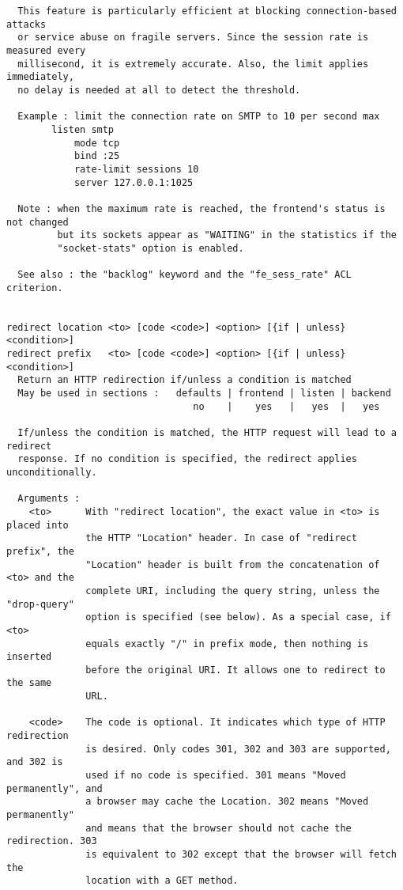 \begin{verbatim}
  This feature is particularly efficient at blocking connection-based attacks
  or service abuse on fragile servers. Since the session rate is measured every
  millisecond, it is extremely accurate. Also, the limit applies immediately,
  no delay is needed at all to detect the threshold.

  Example : limit the connection rate on SMTP to 10 per second max
        listen smtp
            mode tcp
            bind :25
            rate-limit sessions 10
            server 127.0.0.1:1025

  Note : when the maximum rate is reached, the frontend's status is not changed
         but its sockets appear as "WAITING" in the statistics if the
         "socket-stats" option is enabled.

  See also : the "backlog" keyword and the "fe_sess_rate" ACL criterion.


redirect location <to> [code <code>] <option> [{if | unless} <condition>]
redirect prefix   <to> [code <code>] <option> [{if | unless} <condition>]
  Return an HTTP redirection if/unless a condition is matched
  May be used in sections :   defaults | frontend | listen | backend
                                 no    |    yes   |   yes  |   yes

  If/unless the condition is matched, the HTTP request will lead to a redirect
  response. If no condition is specified, the redirect applies unconditionally.

  Arguments :
    <to>      With "redirect location", the exact value in <to> is placed into
              the HTTP "Location" header. In case of "redirect prefix", the
              "Location" header is built from the concatenation of <to> and the
              complete URI, including the query string, unless the "drop-query"
              option is specified (see below). As a special case, if <to>
              equals exactly "/" in prefix mode, then nothing is inserted
              before the original URI. It allows one to redirect to the same
              URL.

    <code>    The code is optional. It indicates which type of HTTP redirection
              is desired. Only codes 301, 302 and 303 are supported, and 302 is
              used if no code is specified. 301 means "Moved permanently", and
              a browser may cache the Location. 302 means "Moved permanently"
              and means that the browser should not cache the redirection. 303
              is equivalent to 302 except that the browser will fetch the
              location with a GET method.


\end{verbatim}
